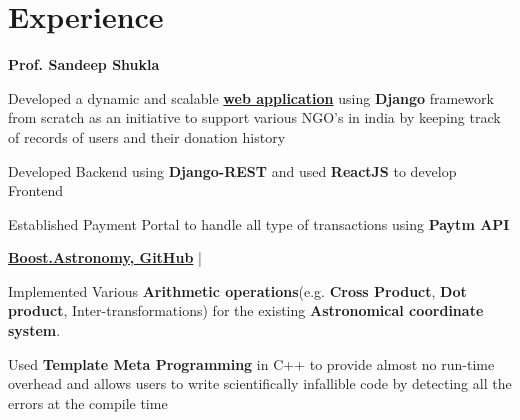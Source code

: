 \documentclass[]{deedy-resume-openfont}
\begin{document}
\hfill
\begin{minipage}[t]{0.66\textwidth} 


\section{Experience}
\textbf{Prof. Sandeep Shukla}
\vspace{\topsep} %
\begin{tightemize}
\item Developed a dynamic and scalable \textbf{\href{https://github.com/RohitRanjangit/One_Rupee}{web application}} using \textbf{Django} 
framework from scratch as an initiative to support various NGO's in india by  
 keeping track of records of users and their donation history
\item Developed Backend using  \textbf{Django-REST} and used \textbf{ReactJS} to develop Frontend
\item Established Payment Portal to handle all type of transactions using \textbf{Paytm API}
\end{tightemize}
\textbf{\href{https://github.com/BoostGSoC19/astronomy}{Boost.Astronomy, GitHub}} | 
\begin{tightemize}
\item Implemented Various \textbf{Arithmetic operations}(e.g. \textbf{Cross Product}, \textbf{Dot product}, Inter-transformations) for the existing \textbf{Astronomical coordinate system}.
\item Used \textbf{Template Meta Programming} in C++ to provide almost no run-time overhead and allows users to write scientifically
infallible code by detecting all the errors at the compile time 
\end{tightemize}

\end{minipage}
\end{document}
